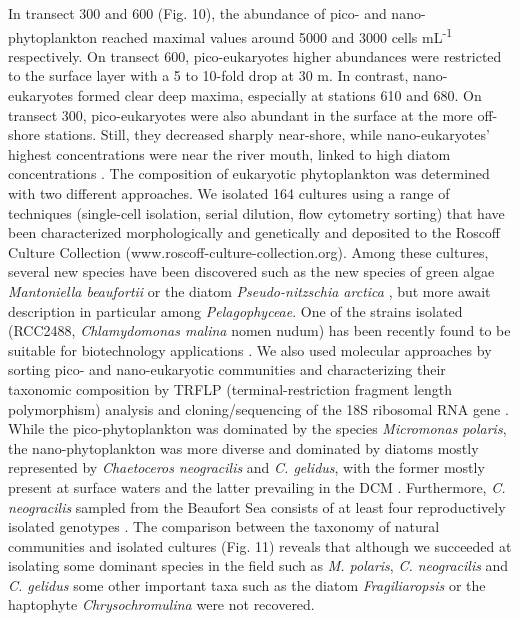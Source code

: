 \documentclass[essd, manuscript]{copernicus}
\begin{document}
In transect 300 and 600 (Fig. 10), the abundance of pico- and nano-phytoplankton reached maximal values around 5000 and 3000 cells mL\textsuperscript{-1} respectively.  On transect 600, pico-eukaryotes higher abundances were restricted to the surface layer with a 5 to 10-fold drop at 30 m.  In contrast, nano-eukaryotes formed clear deep maxima, especially at stations 610 and 680.  On transect 300, pico-eukaryotes were also abundant in the surface at the more off-shore stations. Still, they decreased sharply near-shore, while nano-eukaryotes' highest concentrations were near the river mouth, linked to high diatom concentrations \citep{Balzano2012a}.  The composition of eukaryotic phytoplankton was determined with two different approaches.  We isolated 164 cultures using a range of techniques (single-cell isolation, serial dilution, flow cytometry sorting) that have been characterized morphologically and genetically \citep{Balzano2012b, Balzano2017} and deposited to the Roscoff Culture Collection (www.roscoff-culture-collection.org).  Among these cultures, several new species have been discovered such as the new species of green algae \textit{Mantoniella beaufortii} \citep{Yau2020} or the diatom \textit{Pseudo-nitzschia arctica} \citep{Percopo2016}, but more await description in particular among \textit{Pelagophyceae}.  One of the strains isolated (RCC2488, \textit{Chlamydomonas malina} nomen nudum) has been recently found to be suitable for biotechnology applications \citep{Morales-Sanchez2020}. We also used molecular approaches by sorting pico- and nano-eukaryotic communities and characterizing their taxonomic composition by TRFLP (terminal-restriction fragment length polymorphism) analysis and cloning/sequencing of the 18S ribosomal RNA gene \citep{Balzano2012a}.  While the pico-phytoplankton was dominated by the species \textit{Micromonas polaris}, the nano-phytoplankton was more diverse and dominated by diatoms mostly represented by \textit{Chaetoceros neogracilis} and \textit{C. gelidus}, with the former mostly present at surface waters and the latter prevailing in the DCM \citep{Balzano2012a}. Furthermore, \textit{C. neogracilis} sampled from the Beaufort Sea consists of at least four reproductively isolated genotypes \citep{Balzano2017}.  The comparison between the taxonomy of natural communities and isolated cultures (Fig. 11) reveals that although we succeeded at isolating some dominant species in the field such as \textit{M. polaris}, \textit{C. neogracilis} and \textit{C. gelidus} some other important taxa such as the diatom \textit{Fragiliaropsis} or the haptophyte \textit{Chrysochromulina} were not recovered.
\end{document}
